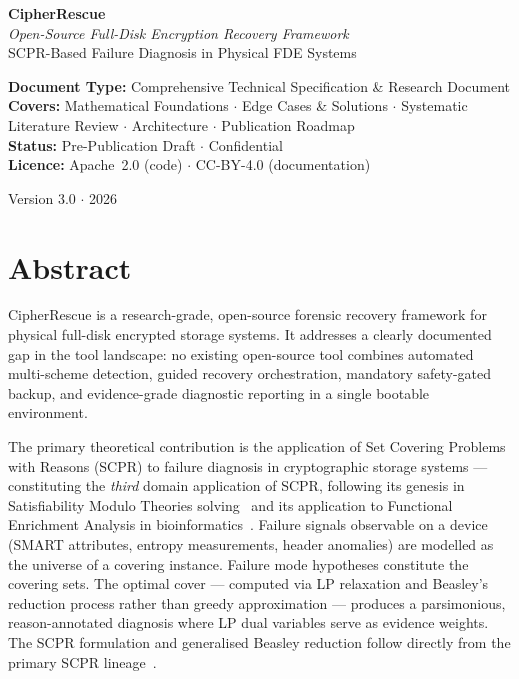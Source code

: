 \documentclass[11pt,a4paper]{report}
\begin{document}
\begin{titlepage}
\centering
\vspace*{2cm}
{\Huge\bfseries\color{navyblue} CipherRescue}\\[0.5cm]
{\Large\color{royalblue}\itshape Open-Source Full-Disk Encryption Recovery Framework}\\[0.3cm]
{\large\color{darkgrey} SCPR-Based Failure Diagnosis in Physical FDE Systems}\\[2cm]

\begin{tcolorbox}[enhanced, colback=lightblue!30, colframe=royalblue, arc=6pt, width=0.85\textwidth]
\centering\small
\textbf{Document Type:} Comprehensive Technical Specification \& Research Document\\[4pt]
\textbf{Covers:} Mathematical Foundations $\cdot$ Edge Cases \& Solutions $\cdot$ Systematic Literature Review $\cdot$ Architecture $\cdot$ Publication Roadmap\\[4pt]
\textbf{Status:} Pre-Publication Draft $\cdot$ Confidential\\[4pt]
\textbf{Licence:} Apache~2.0 (code) $\cdot$ CC-BY-4.0 (documentation)
\end{tcolorbox}

\vfill
{\small\color{midgrey} Version 3.0 $\cdot$ 2026}
\end{titlepage}

\chapter*{Abstract}

CipherRescue is a research-grade, open-source forensic recovery framework for physical full-disk encrypted storage systems. It addresses a clearly documented gap in the tool landscape: no existing open-source tool combines automated multi-scheme detection, guided recovery orchestration, mandatory safety-gated backup, and evidence-grade diagnostic reporting in a single bootable environment.

The primary theoretical contribution is the application of Set Covering Problems with Reasons (SCPR) to failure diagnosis in cryptographic storage systems --- constituting the \emph{third} domain application of SCPR, following its genesis in Satisfiability Modulo Theories solving~\cite{sadeghimanesh2022smt} and its application to Functional Enrichment Analysis in bioinformatics~\cite{babatunde2025thesis}. Failure signals observable on a device (SMART attributes, entropy measurements, header anomalies) are modelled as the universe of a covering instance. Failure mode hypotheses constitute the covering sets. The optimal cover --- computed via LP relaxation and Beasley's reduction process rather than greedy approximation --- produces a parsimonious, reason-annotated diagnosis where LP dual variables serve as evidence weights. The SCPR formulation and generalised Beasley reduction follow directly from the primary SCPR lineage~\cite{babatunde2025thesis}.
\end{document}
